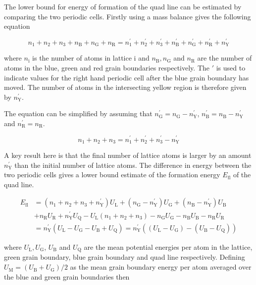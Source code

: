 \documentclass[12pt,a4paper,openany]{report}
\newcommand{\ts}[1]{\textrm{#1}}
\begin{document}
The lower bound for energy of formation of the quad line can be estimated by comparing the two periodic cells. Firstly using a mass balance gives the following equation

\[ n_1 + n_2 + n_3 + n_{\ts{B}} + n_{\ts{G}} + n_{\ts{R}} = n_1^{\prime} + n_2^{\prime} + n_3^{\prime} + n_{\ts{B}}^{\prime} + n_{\ts{G}}^{\prime} + n_{\ts{R}}^{\prime} +
n_{\ts{Y}}^{\prime} \]

where $n_{\ts{i}}$ is the number of atoms in lattice $\ts{i}$ and $n_{\ts{B}}, n_{\ts{G}}$ and $n_{\ts{R}}$ are the number of atoms in the blue, green and red grain boundaries respectively. The $\prime$ is used to indicate values for the right hand periodic cell after the blue grain boundary has moved.  The number of atoms in the intersecting yellow region is therefore given by $n_{\ts{Y}}^{\prime}$.

The equation can be simplified by assuming that $n_{\ts{G}}^{\prime} = n_{\ts{G}}-n_{\ts{Y}}^{\prime}$, $n_{\ts{B}}^{\prime} = n_{\ts{B}}-n_{\ts{Y}}^{\prime}$ and $n_{\ts{R}}^{\prime} = n_{\ts{R}}$. 

\[ n_1 + n_2 + n_3   = n_1^{\prime} + n_2^{\prime} + n_3^{\prime}- n_{\ts{Y}}^{\prime} \]

A key result here is that the final number of lattice atoms is larger by an amount $n_{\ts{Y}}^{\prime}$ than the initial number of lattice atoms. The difference in energy between the two periodic cells gives a lower bound estimate of the formation energy $E_{\ts{fl}}$ of the quad line.

\begin{align*}
 E_{\ts{fl}} &= (n_1+n_2+n_3+n_{\ts{Y}}^{\prime}) U_{\ts{L}} + (n_{\ts{G}} - n_{\ts{Y}}^{\prime}) U_{\ts{G}}
+ (n_{\ts{B}} - n_{\ts{Y}}^{\prime}) U_{\ts{B}} \\ 
&+ n_{\ts{R}} U_{\ts{R}}  + n_{\ts{Y}}^{\prime} U_{\ts{Q}} 
- U_{\ts{L}}(n_1+n_2+n_3) - n_{\ts{G}} U_{\ts{G}}  - n_{\ts{B}} U_{\ts{B}}  - n_{\ts{R}} U_{\ts{R}}   
\\ 
&=  n_{\ts{Y}}^{\prime}(U_{\ts{L}} - U_{\ts{G}} - U_{\ts{B}} + U_{\ts{Q}}) = n_{\ts{Y}}^{\prime}((U_{\ts{L}} - U_{\ts{G}}) - (U_{\ts{B}} - U_{\ts{Q}})) 
\end{align*}

where $U_{\ts{L}}, U_{\ts{G}}$, $U_{\ts{B}}$ and $U_{\ts{Q}}$ are the mean potential energies per atom in the lattice, green grain boundary, blue grain boundary
and quad line respectively. Defining $U_{\ts{M}} = (U_{\ts{B}} + U_{\ts{G}})/2$ as the mean grain boundary energy per atom averaged over the blue and green grain boundaries then
\end{document}
